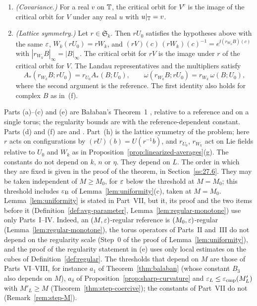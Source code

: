 \begin{theorem}
\begin{enumerate}[label=(\alph*)]
\[
\big|\,dA_*(B)\delta B\,(x)\big|+\big|\nabla\big(dA_*(B)\delta B\big)(x)\big|\le C_6e^{-\gamma'|x-c|}|\delta B| .
\]
\item \emph{(Covariance.)} For a real $v$ on $\mathbb T$, the critical orbit for $V^v$ is the image of the critical orbit for $V$ under any real $u$ with $u|_\mathbb T=v$.
\item \emph{(Lattice symmetry.)} Let $r\in\mathfrak S_k$. Then $rU_0$ satisfies the hypotheses above with the same $\varepsilon$, $W_k(rU_0)=rW_k$, and $(rV)(c)\,(rW_k)(c)^{-1}=e^{\ii(r_{W_k}B)(c)}$ with $|r_{W_k}B|_\infty=|B|_\infty$. The critical orbit for $rV$ is the image under $r$ of the critical orbit for $V$. The Landau representatives and the multipliers satisfy
\[
A_*(r_{W_k}B;rU_0)=r_{U_0}A_*(B;U_0),\qquad\omega(r_{W_k}B;rU_0)=r_{W_k}\,\omega(B;U_0),
\]
where the second argument is the reference. The first identity also holds for complex $B$ as in~(f).
\end{enumerate}
\end{theorem}

Parts (a)--(c) and (e) are Ba\l aban's Theorem~1 \cite{BalVar}, relative to a reference and on a single torus; the regularity bounds are \cite[(9), (10)]{BalVar} with the reference-dependent constant. Parts (d) and (f) are \cite[(171), (178)]{BalVar} and \cite[Prop.~9, (190)]{BalVar}. Part~(h) is the lattice symmetry of the problem; here $r$ acts on configurations by $(rU)(b)=U(r^{-1}b)$, and $r_{U_0}$, $r_{W_k}$ act on Lie fields relative to $U_0$ and $W_k$ as in Proposition~\ref{prop:linearized-averages}(g). The constants do not depend on $k$, $n$ or $\eta$. They depend on $L$. The order in which they are fixed is given in the proof of the theorem, in Section~\ref{ss:27.6}. They may be taken independent of $M\ge M_0$, for $\varepsilon$ below the threshold at $M=M_0$; this threshold includes $\varepsilon_{\rm B}$ of Lemma~\ref{lem:uniformity}(c), taken at $M=M_0$. Lemma~\ref{lem:uniformity} is stated in Part~VII, but it, its proof and the two items before it (Definition~\ref{def:avg-parameter}, Lemma~\ref{lem:regular-monotone}) use only Parts~I--IV. Indeed, an $(M,\varepsilon)$-regular reference is $(M_0,\varepsilon)$-regular (Lemma~\ref{lem:regular-monotone}), the torus operators of Parts~II and~III do not depend on the regularity scale (Step~0 of the proof of Lemma~\ref{lem:uniformity}), and the proof of the regularity statement in (e) uses only local estimates on the cubes of Definition~\ref{def:regular}. The thresholds that depend on $M$ are those of Parts~VI--VIII, for instance $a_1$ of Theorem~\ref{thm:balaban} (whose constant $B_3$ also depends on $M$), $a_\delta$ of Proposition~\ref{prop:sharp-curvature} and $\varepsilon_L\le\varepsilon_{\rm cmp}(M'_L)$ with $M'_L\ge M$ (Theorem~\ref{thm:step-coercive}); the constants of Part~VII do not (Remark~\ref{rem:step-M}).

